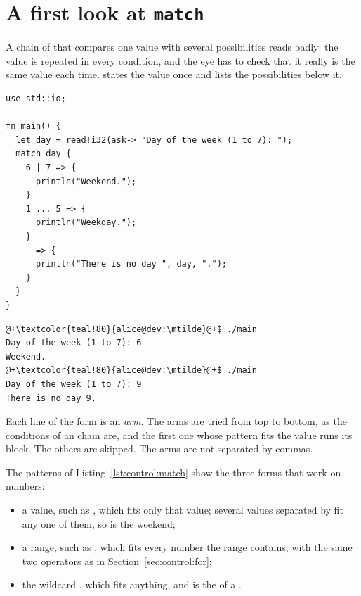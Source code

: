 \vfill\pagebreak
\section{A first look at \texttt{match}}
\label{sec:control:match}

A chain of  that compares one value with several possibilities
reads badly: the value is repeated in every condition, and the eye has to check
that it really is the same value each time.  states the value once
and lists the possibilities below it.

\begin{lstlisting}[style=coloredverbatim, caption=Choosing on the value of a number, label=lst:control:match]
use std::io;

fn main() {
  let day = read!i32(ask-> "Day of the week (1 to 7): ");
  match day {
    6 | 7 => {
      println("Weekend.");
    }
    1 ... 5 => {
      println("Weekday.");
    }
    _ => {
      println("There is no day ", day, ".");
    }
  }
}
\end{lstlisting}
\vspace{-10pt}%
\begin{lstlisting}[style=bashVerb, escapechar=@+]
@+\textcolor{teal!80}{alice@dev:\mtilde}@+$ ./main
Day of the week (1 to 7): 6
Weekend.
@+\textcolor{teal!80}{alice@dev:\mtilde}@+$ ./main
Day of the week (1 to 7): 9
There is no day 9.
\end{lstlisting}

Each line of the form  is an \textit{arm}. The arms
are tried from top to bottom, as the conditions of an  chain are,
and the first one whose pattern fits the value runs its block. The others are
skipped. The arms are not separated by commas.

The patterns of Listing~\ref{lst:control:match} show the three forms that work on
numbers:

\begin{itemize}
\item a value, such as , which fits only that value; several values
  separated by \token{|} fit any one of them, so  is the weekend;
\item a range, such as , which fits every number the range
  contains, with the same two operators as in Section~\ref{sec:control:for};
\item the wildcard \token{\_}, which fits anything, and is the  of a
  .
\end{itemize}

